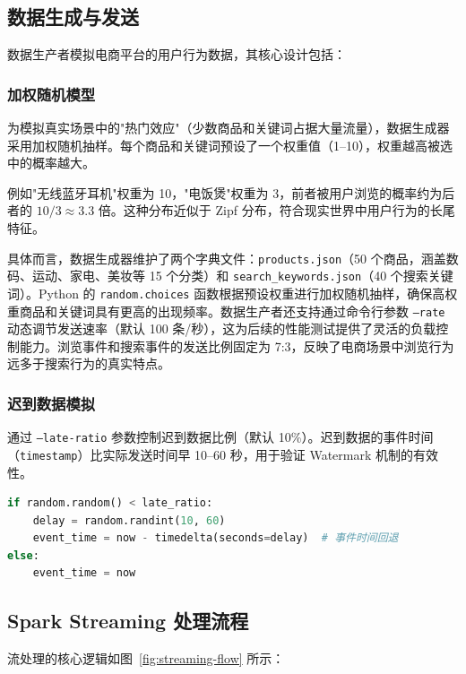 \documentclass[12pt,a4paper]{article}
\begin{document}
\subsection{数据生成与发送}

数据生产者模拟电商平台的用户行为数据，其核心设计包括：

\subsubsection{加权随机模型}

为模拟真实场景中的"热门效应"（少数商品和关键词占据大量流量），数据生成器采用加权随机抽样。每个商品和关键词预设了一个权重值（1--10），权重越高被选中的概率越大。

例如"无线蓝牙耳机"权重为 10，"电饭煲"权重为 3，前者被用户浏览的概率约为后者的 $10/3 \approx 3.3$ 倍。这种分布近似于 Zipf 分布，符合现实世界中用户行为的长尾特征。

具体而言，数据生成器维护了两个字典文件：\texttt{products.json}（50 个商品，涵盖数码、运动、家电、美妆等 15 个分类）和 \texttt{search\_keywords.json}（40 个搜索关键词）。Python 的 \texttt{random.choices} 函数根据预设权重进行加权随机抽样，确保高权重商品和关键词具有更高的出现频率。数据生产者还支持通过命令行参数 \texttt{--rate} 动态调节发送速率（默认 100 条/秒），这为后续的性能测试提供了灵活的负载控制能力。浏览事件和搜索事件的发送比例固定为 7:3，反映了电商场景中浏览行为远多于搜索行为的真实特点。

\subsubsection{迟到数据模拟}

通过 \texttt{--late-ratio} 参数控制迟到数据比例（默认 10\%）。迟到数据的事件时间（\texttt{timestamp}）比实际发送时间早 10--60 秒，用于验证 Watermark 机制的有效性。

\begin{lstlisting}[language=Python, caption={迟到数据模拟}]
if random.random() < late_ratio:
    delay = random.randint(10, 60)
    event_time = now - timedelta(seconds=delay)  # 事件时间回退
else:
    event_time = now
\end{lstlisting}

\subsection{Spark Streaming 处理流程}

流处理的核心逻辑如图~\ref{fig:streaming-flow} 所示：
\end{document}
